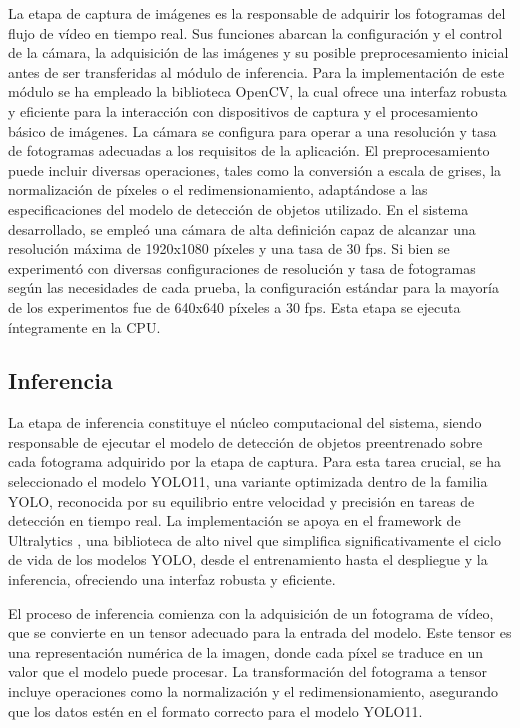 \documentclass[11pt,spanish,listoffigures,listoftables]{tfgetsinf}
\begin{document}
La etapa de captura de imágenes es la responsable de adquirir los fotogramas del flujo de vídeo en tiempo real. Sus funciones abarcan la configuración y el control de la cámara, la adquisición de las imágenes y su posible preprocesamiento inicial antes de ser transferidas al módulo de inferencia. Para la implementación de este módulo se ha empleado la biblioteca OpenCV, la cual ofrece una interfaz robusta y eficiente para la interacción con dispositivos de captura y el procesamiento básico de imágenes. La cámara se configura para operar a una resolución y tasa de fotogramas adecuadas a los requisitos de la aplicación. El preprocesamiento puede incluir diversas operaciones, tales como la conversión a escala de grises, la normalización de píxeles o el redimensionamiento, adaptándose a las especificaciones del modelo de detección de objetos utilizado. En el sistema desarrollado, se empleó una cámara de alta definición capaz de alcanzar una resolución máxima de 1920x1080 píxeles y una tasa de 30 fps. Si bien se experimentó con diversas configuraciones de resolución y tasa de fotogramas según las necesidades de cada prueba, la configuración estándar para la mayoría de los experimentos fue de 640x640 píxeles a 30 fps. Esta etapa se ejecuta íntegramente en la CPU.

\subsection{Inferencia}
La etapa de inferencia constituye el núcleo computacional del sistema, siendo responsable de ejecutar el modelo de detección de objetos preentrenado sobre cada fotograma adquirido por la etapa de captura. Para esta tarea crucial, se ha seleccionado el modelo YOLO11, una variante optimizada dentro de la familia YOLO, reconocida por su equilibrio entre velocidad y precisión en tareas de detección en tiempo real. La implementación se apoya en el framework de Ultralytics \cite{Jocher_Ultralytics_YOLO_2023}, una biblioteca de alto nivel que simplifica significativamente el ciclo de vida de los modelos YOLO, desde el entrenamiento hasta el despliegue y la inferencia, ofreciendo una interfaz robusta y eficiente.

El proceso de inferencia comienza con la adquisición de un fotograma de vídeo, que se convierte en un tensor adecuado para la entrada del modelo. Este tensor es una representación numérica de la imagen, donde cada píxel se traduce en un valor que el modelo puede procesar. La transformación del fotograma a tensor incluye operaciones como la normalización y el redimensionamiento, asegurando que los datos estén en el formato correcto para el modelo YOLO11.
\end{document}
